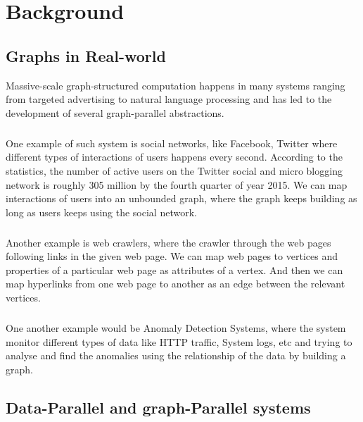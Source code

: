 \documentclass[12pt]{report}
\numberwithin{figure}{section}
\numberwithin{table}{section}
\begin{document}
\chapter{Background}
\section{Graphs in Real-world}
Massive-scale graph-structured computation happens in many systems ranging from targeted advertising to natural language processing and has led to the development of several graph-parallel abstractions. 

\paragraph{}

One example of such system is social networks, like Facebook, Twitter where different types of interactions of users happens every second. According to the statistics, the number of active users on the Twitter social and micro blogging network is roughly 305 million by the fourth quarter of  year 2015\cite{TwitterStats}. We can map interactions of users into an unbounded graph, where the graph keeps building as long as users keeps using the social network.

\paragraph{}

Another example is web crawlers, where the crawler through the web pages following links in the given web page. We can map web pages to vertices and properties of a particular web page as attributes of a vertex. And then we can map hyperlinks from one web page to another as an edge between the relevant vertices.  

\paragraph{}

One another example would be Anomaly  Detection Systems, where the system monitor different types of data like HTTP traffic, System logs, etc and trying to analyse and find the anomalies using the relationship of the data by building a graph.

\section{Data-Parallel and graph-Parallel systems}
\end{document}
